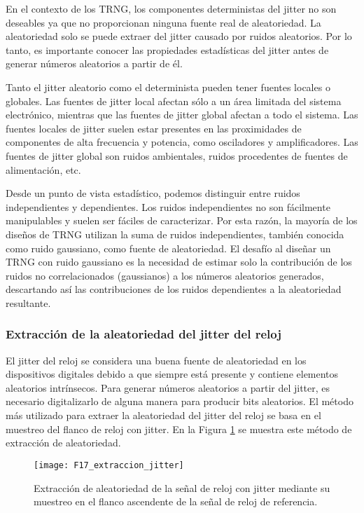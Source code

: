                 En el contexto de los TRNG, los componentes deterministas del jitter no son deseables ya que no proporcionan ninguna fuente real de aleatoriedad. La aleatoriedad solo se puede extraer del jitter causado por ruidos aleatorios. Por lo tanto, es importante conocer las propiedades estadísticas del jitter antes de generar números aleatorios a partir de él.

                Tanto el jitter aleatorio como el determinista pueden tener fuentes locales o globales. Las fuentes de jitter local afectan sólo a un área limitada del sistema electrónico, mientras que las fuentes de jitter global afectan a todo el sistema. Las fuentes locales de jitter suelen estar presentes en las proximidades de componentes de alta frecuencia y potencia, como osciladores y amplificadores. Las fuentes de jitter global son ruidos ambientales, ruidos procedentes de fuentes de alimentación, etc. 

                Desde un punto de vista estadístico, podemos distinguir entre ruidos independientes y dependientes. Los ruidos independientes no son fácilmente manipulables y suelen ser fáciles de caracterizar. Por esta razón, la mayoría de los diseños de TRNG utilizan la suma de ruidos independientes, también conocida como ruido gaussiano, como fuente de aleatoriedad. El desafío al diseñar un TRNG con ruido gaussiano es la necesidad de estimar solo la contribución de los ruidos no correlacionados (gaussianos) a los números aleatorios generados, descartando así las contribuciones de los ruidos dependientes a la aleatoriedad resultante.

            \subsubsection{Extracción de la aleatoriedad del jitter del reloj}

                El jitter del reloj se considera una buena fuente de aleatoriedad en los dispositivos digitales debido a que siempre está presente y contiene elementos aleatorios intrínsecos. Para generar números aleatorios a partir del jitter, es necesario digitalizarlo de alguna manera para producir bits aleatorios. El método más utilizado para extraer la aleatoriedad del jitter del reloj se basa en el muestreo del flanco de reloj con jitter. En la Figura \ref{fig:F17_extraccion_jitter} se muestra este método de extracción de aleatoriedad.

                \begin{figure}[hbtp]
                    \centering
                    \texttt{[image: F17\_extraccion\_jitter]}
                    \caption{Extracción de aleatoriedad de la señal de reloj con jitter mediante su muestreo en el flanco ascendente de la señal de reloj de referencia.}
                    \label{fig:F17_extraccion_jitter}
                \end{figure}

